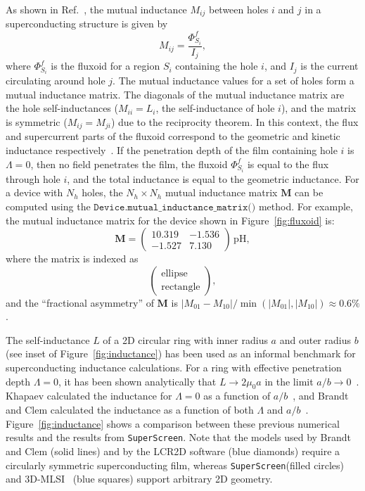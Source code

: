 \documentclass[final,3p,times,twocolumn]{elsarticle}
\newcommand{\inline}[1]{\texttt{#1}\xspace}
\newcommand{\SuperScreen}{\inline{SuperScreen}}
\begin{document}
As shown in Ref.~\cite{Brandt2005-wj}, the mutual inductance $M_{ij}$ between holes $i$ and $j$ in a superconducting structure is given by
\begin{equation}
    M_{ij}=\frac{\Phi^f_{S_i}}{I_j},
\end{equation}
where $\Phi^f_{S_i}$ is the fluxoid for a region $S_i$ containing the hole $i$, and $I_j$ is the current circulating around hole $j$. The mutual inductance values for a set of holes form a mutual inductance matrix. The diagonals of the mutual inductance matrix are the hole self-inductances ($M_{ii}=L_i$, the self-inductance of hole $i$), and the matrix is symmetric ($M_{ij}=M_{ji}$) due to the reciprocity theorem. In this context, the flux and supercurrent parts of the fluxoid correspond to the geometric and kinetic inductance respectively~\cite{Brandt2004-ew}. If the penetration depth of the film containing hole $i$ is $\Lambda = 0$, then no field penetrates the film, the fluxoid $\Phi^f_{S_i}$ is equal to the flux through hole $i$, and the total inductance is equal to the geometric inductance. For a device with $N_h$ holes, the $N_h\times N_h$ mutual inductance matrix $\mathbf{M}$ can be computed using the $\inline{Device.mutual_inductance_matrix()}$ method. For example, the mutual inductance matrix for the device shown in Figure~\ref{fig:fluxoid} is:
\begin{equation*}
    \mathbf{M} = 
    \begin{pmatrix}
    	10.319 & -1.536 \\
        -1.527 & 7.130
    \end{pmatrix}
    \,\mathrm{pH},
\end{equation*}
where the matrix is indexed as $$\begin{pmatrix}\text{ellipse}\\\text{rectangle}\end{pmatrix},$$
and the ``fractional asymmetry'' of $\mathbf{M}$ is $|M_{01} - M_{10}| / \min(|M_{01}|, |M_{10}|)\approx 0.6\%$.

The self-inductance $L$ of a 2D circular ring with inner radius $a$ and outer radius $b$ (see inset of Figure~\ref{fig:inductance}) has been used as an informal benchmark for superconducting inductance calculations. For a ring with effective penetration depth $\Lambda = 0$, it has been shown analytically that $L\to 2\mu_0 a$ in the limit $a/b\to 0$~\cite{Ketchen2012-mb, Babaei_Brojeny2003-la}. Khapaev calculated the inductance for $\Lambda = 0$ as a function of $a/b$~\cite{Khapaev1997-kw}, and Brandt and Clem calculated the inductance as a function of both $\Lambda$ and $a / b$~\cite{Brandt2004-ew}. Figure~\ref{fig:inductance} shows a comparison between these previous numerical results and the results from \SuperScreen. Note that the models used by Brandt and Clem (solid lines) and by the LCR2D software (blue diamonds) require a circularly symmetric superconducting film, whereas \SuperScreen (filled circles) and 3D-MLSI~\cite{Khapaev1997-kw, Khapaev2001-xq, Khapaev2001-pw} (blue squares) support arbitrary 2D geometry. 
\end{document}
